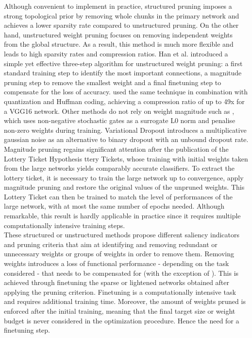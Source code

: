 Although convenient to implement in practice, structured pruning imposes a
strong topological prior by removing whole chunks in the primary network and
achieves a lower sparsity rate compared to unstructured pruning. On the other
hand, unstructured weight pruning focuses on removing independent weights from
the global structure. As a result, this method is much more flexible and leads
to high sparsity rates and compression ratios. Han et al.
\cite{DBLP:conf/nips/HanPTD15} introduced a simple yet effective three-step
algorithm for unstructured weight pruning: a first standard training step to
identify the most important connections, a magnitude pruning step to remove the
smallest weight and a final finetuning step to compensate for the loss of
accuracy. \cite{DBLP:journals/corr/HanMD15} used the same technique in
combination with quantization and Huffman coding, achieving a compression ratio
of up to 49x for a VGG16 network. Other methods do not rely on weight magnitude
such as \cite{DBLP:conf/iclr/LouizosWK18}, which uses non-negative stochastic
gates as a surrogate L0 norm and penalise non-zero weights during training.
Variational Dropout \cite{DBLP:conf/icml/MolchanovAV17} introduces a
multiplicative gaussian noise as an alternative to binary dropout
\cite{DBLP:journals/corr/abs-1207-0580,DBLP:journals/jmlr/SrivastavaHKSS14} with
an unbound dropout rate. Magnitude pruning regains significant attention after
the publication of the Lottery Ticket Hypothesis
\cite{DBLP:conf/iclr/FrankleC19}ttery Tickets, whose training with initial
weights taken from the large networks yields comparably accurate classifiers. To
extract the lottery ticket, it is necessary to train the large network up to
convergence, apply magnitude pruning and restore the original values of the
unpruned weights. This Lottery Ticket can then be trained to match the level of
performances of the large network, with at most the same number of epochs
needed. Although remarkable, this result is hardly applicable in practice since
it requires multiple computationally intensive training steps.\\


These structured or unstructured methods propose different saliency indicators
and pruning criteria that aim at identifying and removing redundant or
unnecessary weights or groups of weights in order to remove them. Removing
weights introduces a loss of functional performance - depending on the task
considered - that needs to be compensated for (with the exception of
\cite{DBLP:conf/icml/KangH20}). This is achieved through finetuning the sparse
or lightened networks obtained after applying the pruning criterion. Finetuning
is a computationally intensive task and requires additional training time.
Moreover, the amount of weights pruned is enforced after the initial training,
meaning that the final target size or weight budget is never considered in the
optimization procedure. Hence the need for a finetuning step. \\


